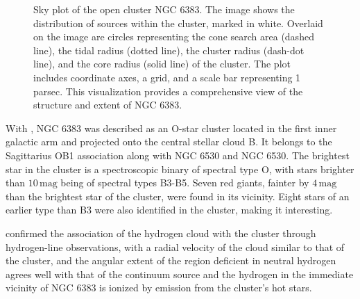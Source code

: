 \documentclass[fleqn,usenatbib,usedcolumn,useAMS]{mnras}
\begin{document}
\begin{figure}
\centering
\caption{Sky plot of the open cluster NGC 6383. The image shows the distribution of sources within the cluster, marked in white. Overlaid on the image are circles representing the cone search area (dashed line), the tidal radius (dotted line), the cluster radius (dash-dot line), and the core radius (solid line) of the cluster. The plot includes coordinate axes, a grid, and a scale bar representing 1 parsec. This visualization provides a comprehensive view of the structure and extent of NGC 6383.}
	\label{fig:sky_general}
\end{figure}

With \citet{1972BAICz..23..126A}, NGC 6383 was described as an O-star cluster located in the first inner galactic arm and projected onto the central stellar cloud B. It belongs to the Sagittarius OB1 association along with NGC 6530 and NGC 6530. The brightest star in the cluster is a spectroscopic binary of spectral type O, with stars brighter than $10\,\textrm{mag}$ being of spectral types B3-B5. Seven red giants, fainter by $4 \,\textrm{mag}$ than the brightest star of the cluster, were found in its vicinity. Eight stars of an earlier type than B3 were also identified in the cluster, making it interesting.

\citet{1973AuJPh..26..853T} confirmed the association of the hydrogen cloud with the cluster through hydrogen-line observations, with a radial velocity of the cloud similar to that of the cluster, and the angular extent of the region deficient in neutral hydrogen agrees well with that of the continuum source and the hydrogen in the immediate vicinity of NGC 6383 is ionized by emission from the cluster's hot stars.
\end{document}
